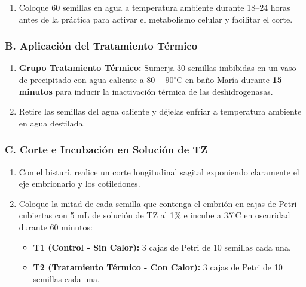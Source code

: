 \documentclass[
  spanish,
  10pt,
  letterpaper,
  twocolumn]{article}
\providecommand{\tightlist}{%
  \setlength{\itemsep}{0pt}\setlength{\parskip}{0pt}}
\begin{document}
\begin{enumerate}
\def\labelenumi{\arabic{enumi}.}
\tightlist
\item
  Coloque 60 semillas en agua a temperatura ambiente durante 18--24
  horas antes de la práctica para activar el metabolismo celular y
  facilitar el corte.
\end{enumerate}

\subsubsection{B. Aplicación del Tratamiento
Térmico}\label{b.-aplicaciuxf3n-del-tratamiento-tuxe9rmico}

\begin{enumerate}
\def\labelenumi{\arabic{enumi}.}
\tightlist
\item
  \textbf{Grupo Tratamiento Térmico:} Sumerja 30 semillas imbibidas en
  un vaso de precipitado con agua caliente a \(80-90^\circ\text{C}\) en
  baño María durante \textbf{15 minutos} para inducir la inactivación
  térmica de las deshidrogenasas.
\item
  Retire las semillas del agua caliente y déjelas enfriar a temperatura
  ambiente en agua destilada.
\end{enumerate}

\subsubsection{C. Corte e Incubación en Solución de
TZ}\label{c.-corte-e-incubaciuxf3n-en-soluciuxf3n-de-tz}

\begin{enumerate}
\def\labelenumi{\arabic{enumi}.}
\tightlist
\item
  Con el bisturí, realice un corte longitudinal sagital exponiendo
  claramente el eje embrionario y los cotiledones.
\item
  Coloque la mitad de cada semilla que contenga el embrión en cajas de
  Petri cubiertas con 5 mL de solución de TZ al 1\% e incube a
  \(35^\circ\text{C}\) en oscuridad durante 60 minutos:

  \begin{itemize}
  \tightlist
  \item
    \textbf{T1 (Control - Sin Calor):} 3 cajas de Petri de 10 semillas
    cada una.
  \item
    \textbf{T2 (Tratamiento Térmico - Con Calor):} 3 cajas de Petri de
    10 semillas cada una.
  \end{itemize}
\end{enumerate}
\end{document}

